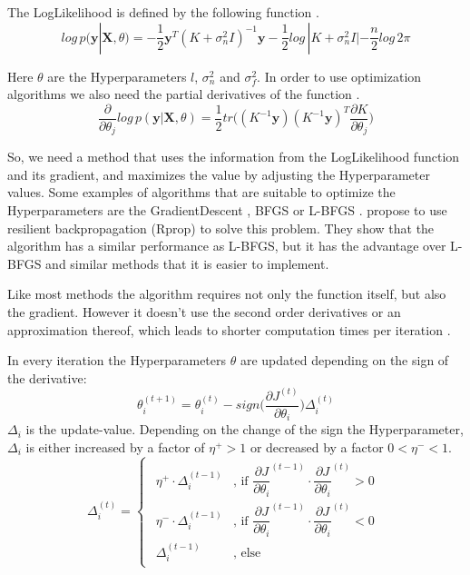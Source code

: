 The \gls{LogLikelihood} is defined by the following function \citep[p.\ 113]{Rasmussen:2005:GPM:1162254}.
\begin{equation} \label{eq:ll}
log\,p(\mathbf{y}|\mathbf{X},\theta) = -\dfrac{1}{2}\mathbf{y}^T(K+\sigma^2_nI)^{-1}\mathbf{y}-\dfrac{1}{2}log\,|K+\sigma^2_nI|-\dfrac{n}{2}log\,2\pi
\end{equation}

Here $\theta$ are the \gls{Hyperparameter}s $l$, $\sigma_n^2$ and $\sigma_f^2$. In order to use optimization algorithms we also need the partial derivatives of the function \citep[p.\ 114]{Rasmussen:2005:GPM:1162254}.
\begin{equation}\label{eq:lld}
\dfrac{\partial}{\partial\theta_j}log\,p(\mathbf{y}|\mathbf{X},\theta) = \dfrac{1}{2}tr\bigg((K^{-1}\mathbf{y}) (K^{-1}\mathbf{y})^T \dfrac{\partial K}{\partial \theta_j}\bigg)
\end{equation}

So, we need a method that uses the information from the \gls{LogLikelihood} function and its gradient, and maximizes the value by adjusting the \gls{Hyperparameter} values. 
Some examples of algorithms that are suitable to optimize the \gls{Hyperparameter}s are the \gls{GradientDescent} \citep{Shewchuk:1994:ICG:865018}, \Gls{BFGS} or \Gls{L-BFGS} \citep{liu1989limited}. \citet{blum2013optimization} propose to use resilient backpropagation (\Gls{Rprop}) to solve this problem. They show that the algorithm has a similar performance as \Gls{L-BFGS}, but it has the advantage over \Gls{L-BFGS} and similar methods that it is easier to implement.

Like most methods the algorithm requires not only the function itself, but also the gradient. However it doesn't use the second order derivatives or an approximation thereof, which leads to shorter computation times per iteration \citep{blum2013optimization}. 

In every iteration the \gls{Hyperparameter}s $\theta$ are updated depending on the sign of the derivative:
\begin{equation}
\theta_i^{(t+1)} = \theta_i^{(t)} - sign\bigg(\dfrac{\partial J^{(t)}}{\partial \theta_i}\bigg) \Delta_i^{(t)}
\end{equation}
$\Delta_i$ is the update-value. Depending on the change of the sign the \gls{Hyperparameter}, $\Delta_i$ is either increased by a factor of $\eta^+ > 1$ or decreased by a factor $0 < \eta^- < 1$. 
\begin{equation}
\Delta_i^{(t)} = 
\begin{cases}
\begin{aligned}
\eta^+\cdot\Delta_i^{(t-1)} &\text{, if } \dfrac{\partial J}{\partial \theta_i}^{(t-1)}\cdot\dfrac{\partial J}{\partial \theta_i}^{(t)} > 0 \\
\eta^-\cdot\Delta_i^{(t-1)} &\text{, if } \dfrac{\partial J}{\partial \theta_i}^{(t-1)}\cdot\dfrac{\partial J}{\partial \theta_i}^{(t)} < 0\\
\Delta_i^{(t-1)} &\text{, else}
\end{aligned}
\end{cases}
\end{equation}

